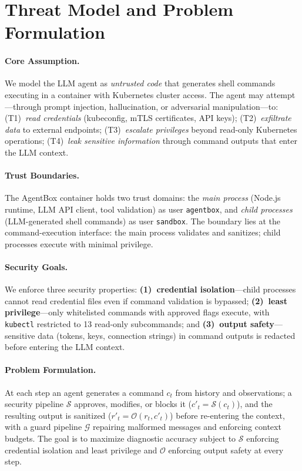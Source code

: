\documentclass[letterpaper]{article}
\begin{document}
\section{Threat Model and Problem Formulation}
\label{sec:threat}

\paragraph{Core Assumption.}
We model the LLM agent as \emph{untrusted code} that generates shell commands executing in a container with Kubernetes cluster access.
The agent may attempt---through prompt injection, hallucination, or adversarial manipulation---to:
(T1)~\emph{read credentials} (kubeconfig, mTLS certificates, API keys);
(T2)~\emph{exfiltrate data} to external endpoints;
(T3)~\emph{escalate privileges} beyond read-only Kubernetes operations;
(T4)~\emph{leak sensitive information} through command outputs that enter the LLM context.

\paragraph{Trust Boundaries.}
The AgentBox container holds two trust domains: the \emph{main process} (Node.js runtime, LLM API client, tool validation) as user \texttt{agentbox}, and \emph{child processes} (LLM-generated shell commands) as user \texttt{sandbox}. The boundary lies at the command-execution interface: the main process validates and sanitizes; child processes execute with minimal privilege.

\paragraph{Security Goals.}
We enforce three security properties: \textbf{(1)~credential isolation}---child processes cannot read credential files even if command validation is bypassed; \textbf{(2)~least privilege}---only whitelisted commands with approved flags execute, with \texttt{kubectl} restricted to 13 read-only subcommands; and \textbf{(3)~output safety}---sensitive data (tokens, keys, connection strings) in command outputs is redacted before entering the LLM context.

\paragraph{Problem Formulation.}
At each step an agent generates a command $c_t$ from history and observations; a security pipeline $\mathcal{S}$ approves, modifies, or blocks it ($c'_t=\mathcal{S}(c_t)$), and the resulting output is sanitized ($r'_t=\mathcal{O}(r_t,c'_t)$) before re-entering the context, with a guard pipeline $\mathcal{G}$ repairing malformed messages and enforcing context budgets. The goal is to maximize diagnostic accuracy subject to $\mathcal{S}$ enforcing credential isolation and least privilege and $\mathcal{O}$ enforcing output safety at every step.
\end{document}

